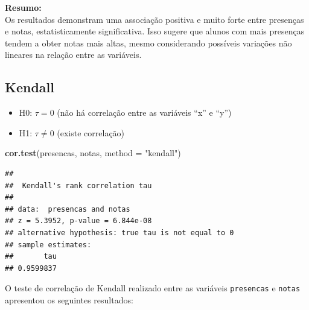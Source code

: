 \documentclass[
]{book}
\newenvironment{Shaded}{\begin{snugshade}}{\end{snugshade}}
\newcommand{\AttributeTok}[1]{\textcolor[rgb]{0.13,0.29,0.53}{#1}}
\newcommand{\FunctionTok}[1]{\textcolor[rgb]{0.13,0.29,0.53}{\textbf{#1}}}
\newcommand{\NormalTok}[1]{#1}
\newcommand{\StringTok}[1]{\textcolor[rgb]{0.31,0.60,0.02}{#1}}
\providecommand{\tightlist}{%
  \setlength{\itemsep}{0pt}\setlength{\parskip}{0pt}}
\begin{document}
\textbf{Resumo:}\\
Os resultados demonstram uma associação positiva e muito forte entre presenças e notas, estatisticamente significativa. Isso sugere que alunos com mais presenças tendem a obter notas mais altas, mesmo considerando possíveis variações não lineares na relação entre as variáveis.

\subsection{Kendall}\label{kendall}

\begin{itemize}
\tightlist
\item
  H0: \(\tau = 0\) (não há correlação entre as variáveis ``x'' e ``y'')
\item
  H1: \(\tau \neq 0\) (existe correlação)
\end{itemize}

\begin{Shaded}
\begin{Highlighting}[]
\FunctionTok{cor.test}\NormalTok{(presencas, notas, }\AttributeTok{method =} \StringTok{"kendall"}\NormalTok{)}
\end{Highlighting}
\end{Shaded}

\begin{verbatim}
## 
##  Kendall's rank correlation tau
## 
## data:  presencas and notas
## z = 5.3952, p-value = 6.844e-08
## alternative hypothesis: true tau is not equal to 0
## sample estimates:
##       tau 
## 0.9599837
\end{verbatim}

O teste de correlação de Kendall realizado entre as variáveis \texttt{presencas} e \texttt{notas} apresentou os seguintes resultados:
\end{document}
